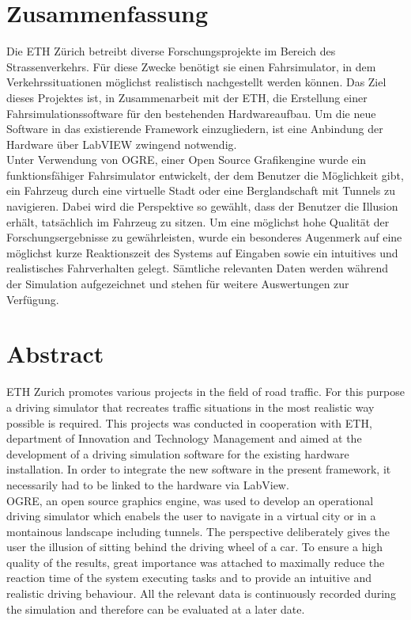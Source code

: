 \section*{Zusammenfassung}
Die ETH Zürich betreibt diverse Forschungsprojekte im Bereich des Strassenverkehrs. Für diese Zwecke benötigt sie einen Fahrsimulator, in dem Verkehrssituationen möglichst realistisch nachgestellt werden können. Das Ziel dieses Projektes ist, in Zusammenarbeit mit der ETH, die Erstellung einer Fahrsimulationssoftware für den bestehenden Hardwareaufbau. Um die neue Software in das existierende Framework einzugliedern, ist eine Anbindung der Hardware über LabVIEW zwingend notwendig.\\
Unter Verwendung von OGRE, einer Open Source Grafikengine wurde ein funktionsfähiger Fahrsimulator entwickelt, der dem Benutzer die Möglichkeit gibt, ein Fahrzeug durch eine virtuelle Stadt oder eine Berglandschaft mit Tunnels zu navigieren. Dabei wird die Perspektive so gewählt, dass der Benutzer die Illusion erhält, tatsächlich im Fahrzeug zu sitzen.
Um eine möglichst hohe Qualität der Forschungsergebnisse zu gewährleisten, wurde ein besonderes Augenmerk auf eine möglichst kurze Reaktionszeit des Systems auf Eingaben sowie ein intuitives und realistisches Fahrverhalten gelegt.
Sämtliche relevanten Daten werden während der Simulation aufgezeichnet und stehen für weitere Auswertungen zur Verfügung.
\newpage
\thispagestyle{empty}
\hspace{1cm}
\newpage
\section*{Abstract}
ETH Zurich promotes various projects in the field of road traffic. For this purpose a driving simulator that recreates traffic situations in the most realistic way possible is required. This projects was conducted in cooperation with ETH, department of Innovation and Technology Management and aimed at the development of a driving simulation software for the existing hardware installation. In order to integrate the new software in the present framework, it necessarily had to be linked to the hardware via LabView. \\
OGRE, an open source graphics engine, was used to develop an operational driving simulator which enabels the user to navigate in a virtual city or in a montainous landscape including tunnels. The perspective deliberately gives the user the illusion of sitting behind the driving wheel of a car. To ensure a high quality of the results, great importance was attached to maximally reduce the reaction time of the system executing tasks and to provide an intuitive and realistic driving behaviour. All the relevant data is continuously recorded during the simulation and therefore can be evaluated at a later date.
\newpage
\thispagestyle{empty}
\hspace{1cm}
\newpage